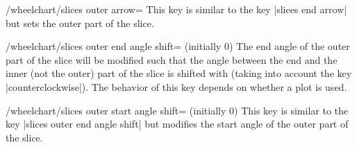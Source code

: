 \documentclass[a4paper,english,dvipsnames]{ltxdoc}
\begin{document}
\begin{key}{/wheelchart/slices outer arrow=}
This key is similar to the key |slices end arrow| but sets the outer part of the slice.
\begin{codeexample}[width=10cm]
\end{codeexample}
\begin{codeexample}[width=10cm]
\end{codeexample}
\begin{codeexample}[width=10cm]
\end{codeexample}
\end{key}
\begin{key}{/wheelchart/slices outer end angle shift= (initially 0)}
The end angle of the outer part of the slice will be modified such that the angle between the end and the inner (not the outer) part of the slice is shifted with  (taking into account the key |counterclockwise|). The behavior of this key depends on whether a plot is used.
\end{key}
\begin{key}{/wheelchart/slices outer start angle shift= (initially 0)}
This key is similar to the key |slices outer end angle shift| but modifies the start angle of the outer part of the slice.
\end{key}
\end{document}
